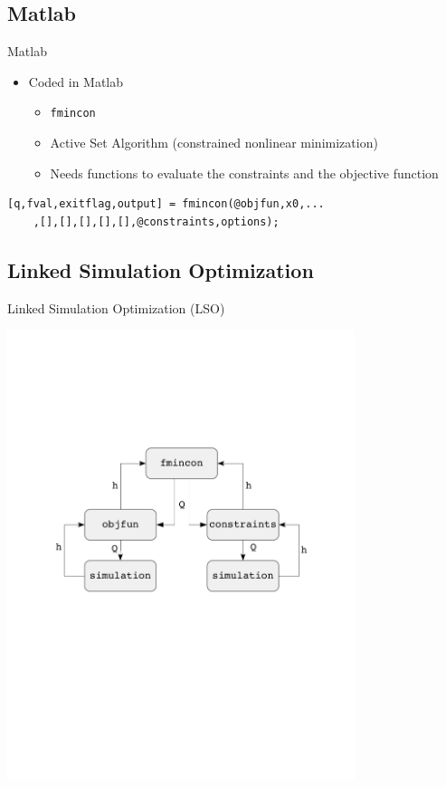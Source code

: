 \documentclass[xcolor=x11names,compress]{beamer}
\renewcommand{\(}{\begin{columns}}
\renewcommand{\)}{\end{columns}}
\newcommand{\<}[1]{\begin{column}{#1}}
\renewcommand{\>}{\end{column}}
\begin{document}
\subsection{Matlab}
\begin{frame}[fragile]{Matlab}

\begin{itemize}
\item Coded in Matlab 
\begin{itemize}
	\item \texttt{fmincon}
	\item Active Set Algorithm (constrained nonlinear minimization)
	\item Needs functions to evaluate the constraints and the objective function
\end{itemize} 
\end{itemize}
\begin{verbatim}
[q,fval,exitflag,output] = fmincon(@objfun,x0,...
    ,[],[],[],[],[],@constraints,options);
\end{verbatim}

\end{frame}

\subsection{Linked Simulation Optimization}
\begin{frame}{Linked Simulation Optimization (LSO)}

   \centering
   \includegraphics[width=4in]{flow.pdf} 

\end{frame}
\end{document}
